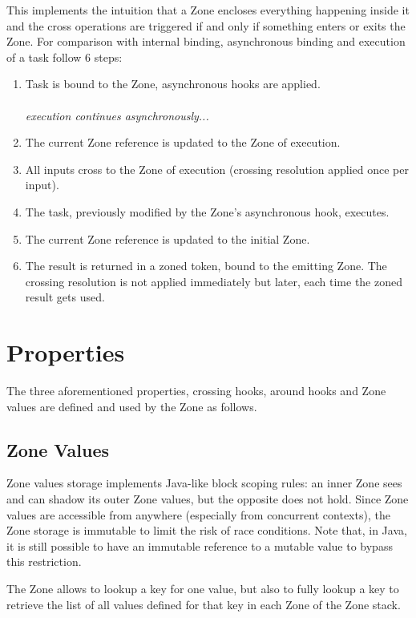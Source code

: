 This implements the intuition that a Zone encloses everything happening inside it and the cross operations are triggered if and only if something enters or exits the Zone.
For comparison with internal binding, asynchronous binding and execution of a task follow 6 steps:

\begin{enumerate}
\item Task is bound to the Zone, asynchronous hooks are applied. \\ \\
\textit{execution continues asynchronously...} \\
\item The current Zone reference is updated to the Zone of execution.
\item All inputs cross to the Zone of execution (crossing resolution applied once per input).
\item The task, previously modified by the Zone's asynchronous hook, executes.
\item The current Zone reference is updated to the initial Zone.
\item The result is returned in a zoned token, bound to the emitting Zone. The crossing resolution is not applied immediately but later, each time the zoned result gets used.

\end{enumerate}

\section{Properties} %

The three aforementioned properties, crossing hooks, around hooks and Zone values are defined and used by the Zone as follows.

\subsection*{Zone Values}
Zone values storage implements Java-like block scoping rules: an inner Zone sees and can shadow its outer Zone values, but the opposite does not hold. Since Zone values are accessible from anywhere (especially from concurrent contexts), the Zone storage is immutable to limit the risk of race conditions. Note that, in Java, it is still possible to have an immutable reference to a mutable value to bypass this restriction.

The Zone allows to lookup a key for one value, but also to fully lookup a key to retrieve the list of all values defined for that key in each Zone of the Zone stack.

